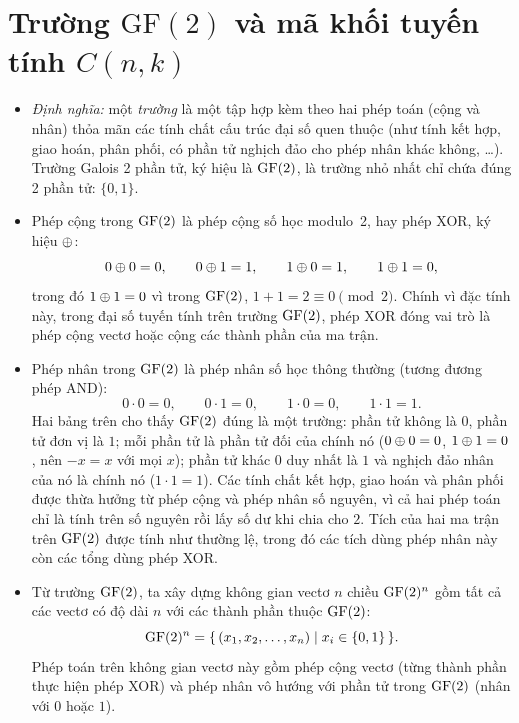 \section{Trường \texorpdfstring{$\mathrm{GF}(2)$}{GF(2)} và mã khối tuyến tính \texorpdfstring{$C(n,k)$}{C(n,k)}}
\label{sec:1.2}

\begin{itemize}
  \item \emph{Định nghĩa:} một \emph{trường} là một tập hợp kèm theo hai phép
        toán (cộng và nhân) thỏa mãn các tính chất cấu trúc đại số quen thuộc
        (như tính kết hợp, giao hoán, phân phối, có phần tử nghịch đảo cho
        phép nhân khác không, \dots). Trường Galois 2 phần tử, ký hiệu là
        $\mathrm{GF}(2)$, là trường nhỏ nhất chỉ chứa đúng 2 phần tử: $\{0,1\}$.
  \item Phép cộng trong $\mathrm{GF}(2)$ là phép cộng số học modulo~2, hay phép XOR,
        ký hiệu $\oplus$:
\[
  0 \oplus 0 = 0,\qquad 0 \oplus 1 = 1,\qquad 1 \oplus 0 = 1,\qquad 1 \oplus 1 = 0 ,
\]
trong đó $1 \oplus 1 = 0$ vì trong $\mathrm{GF}(2)$, $1 + 1 = 2 \equiv 0 \pmod 2$. Chính
vì đặc tính này, trong đại số tuyến tính trên trường $\mathrm{GF}(2)$, phép XOR đóng vai
trò là phép cộng vectơ hoặc cộng các thành phần của ma trận.
  \item Phép nhân trong $\mathrm{GF}(2)$ là phép nhân số học thông thường (tương đương
        phép AND):
\[
  0 \cdot 0 = 0,\qquad 0 \cdot 1 = 0,\qquad 1 \cdot 0 = 0,\qquad 1 \cdot 1 = 1 .
\]
Hai bảng trên cho thấy $\mathrm{GF}(2)$ đúng là một trường: phần tử không là $0$, phần
tử đơn vị là $1$; mỗi phần tử là phần tử đối của chính nó ($0 \oplus 0 = 0$,
$1 \oplus 1 = 0$, nên $-x = x$ với mọi $x$); phần tử khác $0$ duy nhất là $1$
và nghịch đảo nhân của nó là chính nó ($1 \cdot 1 = 1$). Các tính chất kết
hợp, giao hoán và phân phối được thừa hưởng từ phép cộng và phép nhân số
nguyên, vì cả hai phép toán chỉ là tính trên số nguyên rồi lấy số dư khi chia
cho $2$. Tích của hai ma trận trên $\mathrm{GF}(2)$ được tính như thường lệ, trong đó các
tích dùng phép nhân này còn các tổng dùng phép XOR.
  \item Từ trường $\mathrm{GF}(2)$, ta xây dựng không gian vectơ $n$ chiều $\mathrm{GF}(2)^{n}$ gồm
        tất cả các vectơ có độ dài $n$ với các thành phần thuộc $\mathrm{GF}(2)$:
\[
  \mathrm{GF}(2)^{n} = \{\, (x_1, x_2, \dots, x_n) \mid x_i \in \{0,1\} \,\}.
\]
Phép toán trên không gian vectơ này gồm phép cộng vectơ (từng thành phần thực
hiện phép XOR) và phép nhân vô hướng với phần tử trong $\mathrm{GF}(2)$ (nhân với $0$
hoặc $1$).
\end{itemize}

